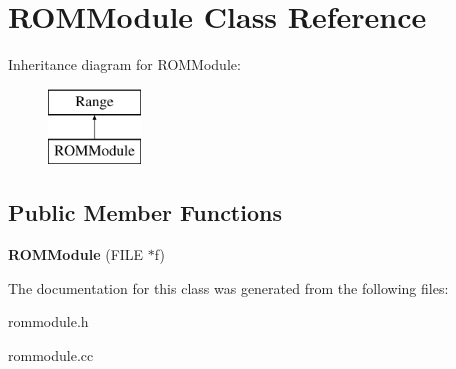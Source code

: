 \hypertarget{classROMModule}{
\section{ROMModule Class Reference}
\label{classROMModule}
}
Inheritance diagram for ROMModule:\begin{figure}[H]
\begin{center}
\leavevmode
\includegraphics[height=2cm]{classROMModule}
\end{center}
\end{figure}
\subsection*{Public Member Functions}
\begin{DoxyCompactItemize}
\item 
\hypertarget{classROMModule_ad158896a7c2b34808b27b7c6cd37a591}{
{\bfseries ROMModule} (FILE $\ast$f)}
\label{classROMModule_ad158896a7c2b34808b27b7c6cd37a591}

\end{DoxyCompactItemize}


The documentation for this class was generated from the following files:\begin{DoxyCompactItemize}
\item 
rommodule.h\item 
rommodule.cc\end{DoxyCompactItemize}
